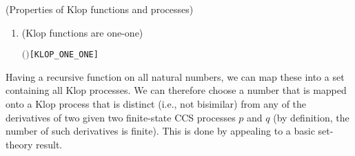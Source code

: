 \begin{proposition}{(Properties of Klop functions and processes)}
\begin{enumerate}
\begin{alltt}
\HOLTokenTurnstile{}  \HOLSymConst{\HOLTokenLt{}}  \HOLSymConst{\HOLTokenImp{}} \HOLSymConst{\HOLTokenNeg{}}\ensuremath{(}   \HOLSymConst{\HOLTokenWeakEQ}   \ensuremath{)}\hfill{[KLOP_PROP2']}
\end{alltt}
\item (Klop functions are one-one)
\begin{alltt}
\HOLTokenTurnstile{}  \ensuremath{(} \ensuremath{)}\hfill{[KLOP_ONE_ONE]}
\end{alltt}
\end{enumerate}
\end{proposition}
Having
 a recursive function  on all natural numbers,
  we can map these into a set containing  all Klop processes. 
We can therefore 
choose a number that is mapped onto a Klop process
that is distinct (i.e., not bisimilar)  from 
any  of the derivatives of two  given 
two finite-state CCS processes $p$ and $q$
(by definition, the number of such derivatives is finite).
This is done by 
appealing to a basic set-theory result.

